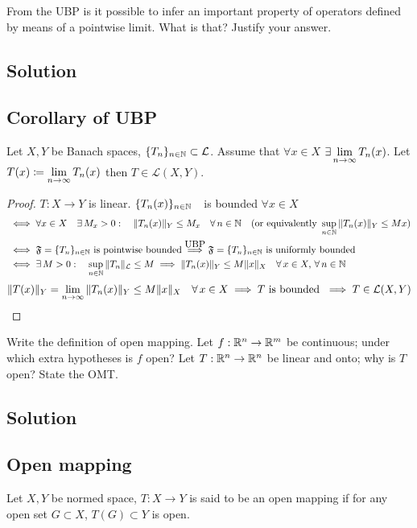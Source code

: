 \question
From the UBP is it possible to infer an important property of operators defined by means of a pointwise limit. What is that? Justify your answer.

\subsection*{Solution}

\subsection{Corollary of UBP}
Let $X,Y$ be Banach spaces, $\{T_n\}_{n\in\mathbb{N}}\subset\mathcal{L}$. Assume that $\forall x\in X$ $\displaystyle\exists\lim_{n\to\infty}T_n(x)$. Let $\displaystyle T(x)\coloneqq\lim_{n\to\infty} T_n(x)$ then $\displaystyle T\in\mathcal{L}(X,Y)$.
\begin{proof}
    $T:X\rightarrow Y$ is linear. $\{T_n(x)\}_{n\in\mathbb{N}} \quad $is bounded $\forall x\in X$  
    \[\begin{aligned}
        &\iff \forall x\in X\quad\exists\,M_x>0:\quad\|T_n(x)\|_Y\leq M_x\quad\forall\,n\in\mathbb{N} \quad(\mbox{or equivalently } \sup_{n\in\mathbb{N}}\|T_n(x)\|_Y\leq Mx)\\
        &\iff \mathfrak{F}=\{T_n\}_{n\in\mathbb{N}} \mbox{ is pointwise bounded} \overset{{\mbox{UBP}}}{\implies}\mathfrak{F}=\{T_n\}_{n\in\mathbb{N}} \mbox{ is uniformly bounded}\\
        &\iff\exists\,M>0:\quad\sup_{n\in\mathbb{N}}\|T_n\|_\mathcal{L}\leq M\implies\|T_n(x)\|_Y\leq M\|x\|_X\quad\forall\,x\in X,\,\forall\,n\in\mathbb{N}
    \end{aligned}
    \]
    \[\|T(x)\|_Y=\lim_{n\to\infty}\|T_n(x)\|_Y\leq M\|x\|_X\quad\forall\,x\in X\implies T\mbox{ is bounded }\implies T\in \mathcal{L}(X,Y)\]
\end{proof}


\question
Write the definition of open mapping. Let $f:\mathbb{R}^n\rightarrow\mathbb{R}^m$ be continuous; under which extra hypotheses is $f$ open? Let $T:\mathbb{R}^n\rightarrow\mathbb{R}^n$ be linear and onto; why is $T$ open? State the OMT.

\subsection*{Solution}

\subsection{Open mapping}
 Let $X,Y$ be normed space, $T:X\rightarrow Y$ is said to be an open mapping if for any open set $G\subset X$, $T(G)\subset Y$ is open.
 
